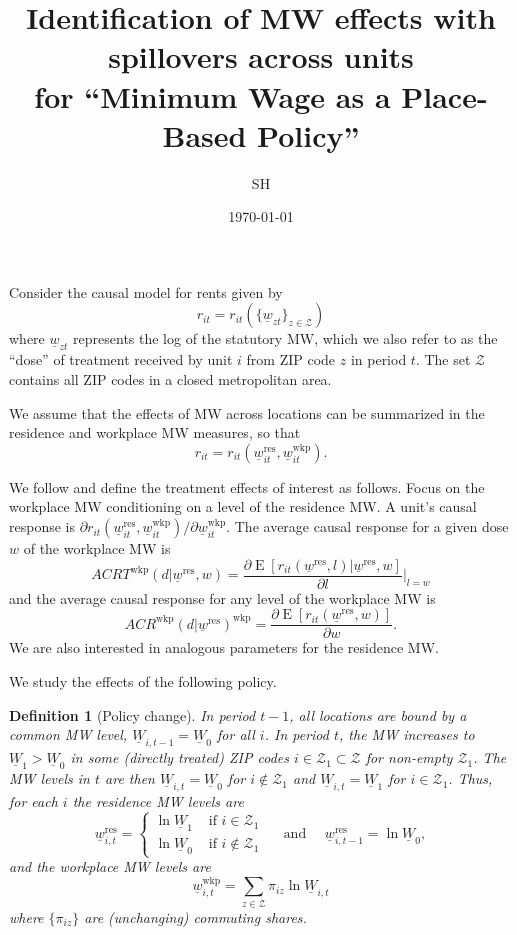 \documentclass{article}
\title{Identification of MW effects with spillovers across units \\
       \Large for ``Minimum Wage as a Place-Based Policy''}
\author{SH}
\date{\today}
\newtheorem{definition}{Definition}
\newcommand{\Z}{\mathcal{Z}}
\newcommand{\MW}{\underline{W}}
\newcommand{\mw}{\underline{w}}
\newcommand{\wkp}{\text{wkp}}
\newcommand{\res}{\text{res}}
\DeclareMathOperator{\E}{E}
\begin{document}
\maketitle

Consider the causal model for rents given by
$$r_{it}=r_{it}(\{\mw_{zt}\}_{z\in\Z})$$
where $\mw_{zt}$ represents the log of the statutory MW, which we also
refer to as the ``dose'' of treatment received by unit $i$ from ZIP code $z$ 
in period $t$.
The set $\Z$ contains all ZIP codes in a closed metropolitan area.

We assume that the effects of MW across locations can be summarized in the
residence and workplace MW measures, so that
\begin{equation}\label{eq:causal_model}
    r_{it} = r_{it}(\mw_{it}^{\res}, \mw_{it}^{\wkp}) .
\end{equation}

We follow \textcite{AngristImbens1995} and define the treatment effects of 
interest as follows.
Focus on the workplace MW conditioning on a level of the residence MW.
A unit's causal response is 
$\partial r_{it}(\mw_{it}^{\res}, \mw_{it}^{\wkp})/\partial \mw_{it}^{\wkp} .$
The average causal response for a given dose $w$ of the workplace MW is
\begin{equation*}
    ACRT^{\wkp}(d | \mw^{\res}, w) = \frac{\partial \E\left[r_{it}(\mw^{\res}, l)
    |                           \mw^{\res}, w\right]}{\partial l} \Big|_{l=w}
\end{equation*}
and the average causal response for any level of the workplace MW is
\begin{equation*}
    ACR^{\wkp}(d | \mw^{\res})^{\wkp} = \frac{\partial \E\left[r_{it}(\mw^{\res}, w) \right] }{\partial w} .
\end{equation*}
We are also interested in analogous parameters for the residence MW.

We study the effects of the following policy.
\begin{definition}[Policy change]\label{def:policy_change}
    In period $t-1$, all locations are bound by a common MW level, 
    $\MW_{i,t-1}=\MW_0$ for all $i$.
    In period $t$, the MW increases to $\MW_1>\MW_0$ in some 
    (directly treated) ZIP codes $i\in\Z_1\subset\Z$ for non-empty $\Z_1$.
    The MW levels in $t$ are then 
    $\MW_{i,t}=\MW_0$ for $i\notin\Z_1$ and
    $\MW_{i,t}=\MW_1$ for $i\in\Z_1$.
    Thus, for each $i$ the residence MW levels are
    $$
    \mw_{i,t}^{\res} = 
    \begin{cases}
        \ln \MW_1 & \text{ if } i\in\Z_1 \\
        \ln \MW_0 & \text{ if } i\notin\Z_1 
    \end{cases}
    \quad\text{ and }\quad
    \mw_{i,t-1}^{\res} = \ln \MW_0 ,
    $$
    and the workplace MW levels are
    $$
    \mw_{i,t}^{\wkp} = \sum_{z\in\Z} \pi_{iz} \ln \MW_{i,t}
    $$
    where $\{\pi_{iz}\}$ are (unchanging) commuting shares.
\end{definition}
\end{document}
